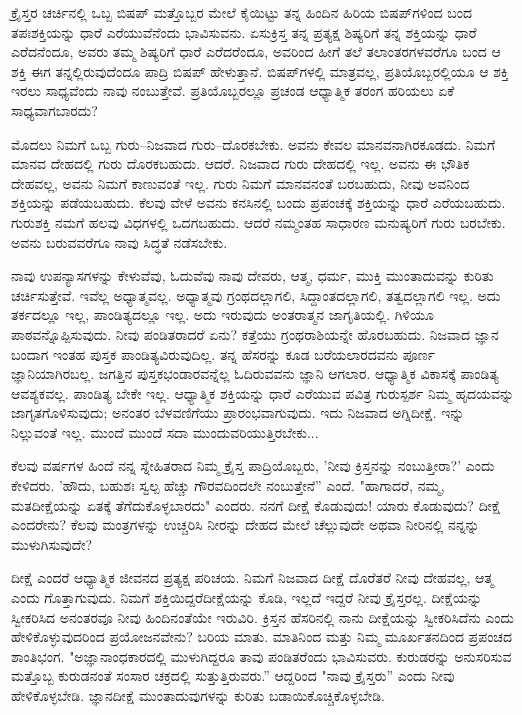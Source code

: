  ಕ್ರೈಸ್ತರ ಚರ್ಚಿನಲ್ಲಿ ಒಬ್ಬ ಬಿಷಪ್ ಮತ್ತೊಬ್ಬರ ಮೇಲೆ ಕೈಯಿಟ್ಟು ತನ್ನ ಹಿಂದಿನ ಹಿರಿಯ ಬಿಷಪ್‌ಗಳಿಂದ ಬಂದ ತಪಃಶಕ್ತಿಯನ್ನು ಧಾರೆ ಎರೆಯುವೆನೆಂದು ಭಾವಿಸುವನು. ಏಸುಕ್ರಿಸ್ತ ತನ್ನ ಪ್ರತ್ಯಕ್ಷ ಶಿಷ್ಯರಿಗೆ ತನ್ನ ಶಕ್ತಿಯನ್ನು ಧಾರೆ ಎರೆದನೆಂದೂ, ಅವರು ತಮ್ಮ ಶಿಷ್ಯರಿಗೆ ಧಾರೆ ಎರೆದರೆಂದೂ, ಅವರಿಂದ ಹೀಗೆ ತಲೆ ತಲಾಂತರಗಳವರೆಗೂ ಬಂದ ಆ ಶಕ್ತಿ ಈಗ ತನ್ನಲ್ಲಿರುವುದೆಂದೂ ಪಾದ್ರಿ ಬಿಷಪ್ ಹೇಳುತ್ತಾನೆ. ಬಿಷಪ್‌ಗಳಲ್ಲಿ ಮಾತ್ರವಲ್ಲ, ಪ್ರತಿಯೊಬ್ಬರಲ್ಲಿಯೂ ಆ ಶಕ್ತಿ ಇರಲು ಸಾಧ್ಯವೆಂದು ನಾವು ನಂಬುತ್ತೇವೆ. ಪ್ರತಿಯೊಬ್ಬರಲ್ಲೂ ಪ್ರಚಂಡ ಆಧ್ಯಾತ್ಮಿಕ ತರಂಗ ಹರಿಯಲು ಏಕೆ ಸಾಧ್ಯವಾಗಬಾರದು?

ಮೊದಲು ನಿಮಗೆ ಒಬ್ಬ ಗುರು–ನಿಜವಾದ ಗುರು–ದೊರಕಬೇಕು. ಅವನು ಕೇವಲ ಮಾನವನಾಗಿರಕೂಡದು. ನಿಮಗೆ ಮಾನವ ದೇಹದಲ್ಲಿ ಗುರು ದೊರಕಬಹುದು. ಆದರೆ. ನಿಜವಾದ ಗುರು ದೇಹದಲ್ಲಿ ಇಲ್ಲ. ಅವನು ಈ ಭೌತಿಕ ದೇಹವಲ್ಲ, ಅವನು ನಿಮಗೆ ಕಾಣುವಂತೆ ಇಲ್ಲ. ಗುರು ನಿಮಗೆ ಮಾನವನಂತೆ ಬರಬಹುದು, ನೀವು ಅವನಿಂದ ಶಕ್ತಿಯನ್ನು ಪಡೆಯಬಹುದು. ಕೆಲವು ವೇಳೆ ಅವನು ಕನಸಿನಲ್ಲಿ ಬಂದು ಪ್ರಪಂಚಕ್ಕೆ ಶಕ್ತಿಯನ್ನು ಧಾರೆ ಎರೆಯಬಹುದು. ಗುರುಶಕ್ತಿ ನಮಗೆ ಹಲವು ವಿಧಗಳಲ್ಲಿ ಒದಗಬಹುದು. ಆದರೆ ನಮ್ಮಂತಹ ಸಾಧಾರಣ ಮನುಷ್ಯರಿಗೆ ಗುರು ಬರಬೇಕು. ಅವನು ಬರುವವರೆಗೂ ನಾವು ಸಿದ್ಧತೆ ನಡೆಸಬೇಕು.

ನಾವು ಉಪನ್ಯಾಸಗಳನ್ನು ಕೇಳುವೆವು, ಓದುವೆವು ನಾವು ದೇವರು, ಆತ್ಮ, ಧರ್ಮ, ಮುಕ್ತಿ ಮುಂತಾದುವನ್ನು ಕುರಿತು ಚರ್ಚಿಸುತ್ತೇವೆ. ಇವೆಲ್ಲ ಅಧ್ಯಾತ್ಮವಲ್ಲ. ಅಧ್ಯಾತ್ಮವು ಗ್ರಂಥದಲ್ಲಾಗಲಿ, ಸಿದ್ದಾಂತದಲ್ಲಾಗಲಿ, ತತ್ವದಲ್ಲಾಗಲಿ ಇಲ್ಲ. ಅದು ತರ್ಕದಲ್ಲೂ ಇಲ್ಲ, ಪಾಂಡಿತ್ಯದಲ್ಲೂ ಇಲ್ಲ. ಅದು ಇರುವುದು ಅಂತರಾತ್ಮನ ಜಾಗೃತಿಯಲ್ಲಿ. ಗಿಳಿಯೂ ಪಾಠವನ್ನೊಪ್ಪಿಸುವುದು. ನೀವು ಪಂಡಿತರಾದರೆ ಏನು? ಕತ್ತೆಯು ಗ್ರಂಥರಾಶಿಯನ್ನೇ ಹೊರಬಹುದು. ನಿಜವಾದ ಜ್ಞಾನ ಬಂದಾಗ ಇಂತಹ ಪುಸ್ತಕ ಪಾಂಡಿತ್ಯವಿರುವುದಿಲ್ಲ. ತನ್ನ ಹೆಸರನ್ನು ಕೂಡ ಬರೆಯಲಾರದವನು ಪೂರ್ಣ ಜ್ಞಾನಿಯಾಗಿರಬಲ್ಲ. ಜಗತ್ತಿನ ಪುಸ್ತಕಭಂಡಾರವನ್ನೆಲ್ಲ ಓದಿರುವವನು ಜ್ಞಾನಿ ಆಗಲಾರ. ಆಧ್ಯಾತ್ಮಿಕ ವಿಕಾಸಕ್ಕೆ ಪಾಂಡಿತ್ಯ ಆವಶ್ಯಕವಲ್ಲ. ಪಾಂಡಿತ್ಯ ಬೇಕೇ ಇಲ್ಲ. ಆಧ್ಯಾತ್ಮಿಕ ಶಕ್ತಿಯನ್ನು ಧಾರೆ ಎರೆಯುವ ಪವಿತ್ರ ಗುರುಸ್ಪರ್ಶ ನಿಮ್ಮ ಹೃದಯವನ್ನು ಜಾಗೃತಗೊಳಿಸುವುದು; ಅನಂತರ ಬೆಳವಣಿಗೆಯು ಪ್ರಾರಂಭವಾಗುವುದು. ಇದು ನಿಜವಾದ ಅಗ್ನಿದೀಕ್ಷೆ. ಇನ್ನು ನಿಲ್ಲುವಂತೆ ಇಲ್ಲ. ಮುಂದೆ ಮುಂದೆ ಸದಾ ಮುಂದುವರಿಯುತ್ತಿರಬೇಕು...

ಕೆಲವು ವರ್ಷಗಳ ಹಿಂದೆ ನನ್ನ ಸ್ನೇಹಿತರಾದ ನಿಮ್ಮ ಕ್ರೈಸ್ತ ಪಾದ್ರಿಯೊಬ್ಬರು, 'ನೀವು ಕ್ರಿಸ್ತನನ್ನು ನಂಬುತ್ತೀರಾ?' ಎಂದು ಕೇಳಿದರು. 'ಹೌದು, ಬಹುಶಃ ಸ್ವಲ್ಪ ಹೆಚ್ಚು ಗೌರವದಿಂದಲೇ ನಂಬುತ್ತೇನೆ” ಎಂದೆ. "ಹಾಗಾದರೆ, ನಮ್ಮ, ಮತದೀಕ್ಷೆಯನ್ನು ಏತಕ್ಕೆ ತೆಗೆದುಕೊಳ್ಳಬಾರದು" ಎಂದರು. ನನಗೆ ದೀಕ್ಷೆ ಕೊಡುವುದು! ಯಾರು ಕೊಡುವುದು? ದೀಕ್ಷೆ ಎಂದರೇನು? ಕೆಲವು ಮಂತ್ರಗಳನ್ನು ಉಚ್ಚರಿಸಿ ನೀರನ್ನು ದೇಹದ ಮೇಲೆ ಚೆಲ್ಲುವುದೇ ಅಥವಾ ನೀರಿನಲ್ಲಿ ನನ್ನನ್ನು ಮುಳುಗಿಸುವುದೇ?

ದೀಕ್ಷೆ ಎಂದರೆ ಆಧ್ಯಾತ್ಮಿಕ ಜೀವನದ ಪ್ರತ್ಯಕ್ಷ ಪರಿಚಯ. ನಿಮಗೆ ನಿಜವಾದ ದೀಕ್ಷೆ ದೊರೆತರೆ ನೀವು ದೇಹವಲ್ಲ, ಆತ್ಮ ಎಂದು ಗೊತ್ತಾಗುವುದು. ನಿಮಗೆ ಶಕ್ತಿಯಿದ್ದರೆ\break ದೀಕ್ಷೆಯನ್ನು ಕೊಡಿ, ಇಲ್ಲದೆ ಇದ್ದರೆ ನೀವು ಕ್ರೈಸ್ತರಲ್ಲ. ದೀಕ್ಷೆಯನ್ನು ಸ್ವೀಕರಿಸಿದ ಅನಂತರವೂ ನೀವು ಹಿಂದಿನಂತೆಯೇ ಇರುವಿರಿ. ಕ್ರಿಸ್ತನ ಹೆಸರಿನಲ್ಲಿ ನಾನು ದೀಕ್ಷೆಯನ್ನು ಸ್ವೀಕರಿಸಿದೆನು ಎಂದು ಹೇಳಿಕೊಳ್ಳುವುದರಿಂದ ಪ್ರಯೋಜನವೇನು? ಬರಿಯ ಮಾತು. ಮಾತಿನಿಂದ ಮತ್ತು ನಿಮ್ಮ ಮೂರ್ಖತನದಿಂದ ಪ್ರಪಂಚದ ಶಾಂತಿಭಂಗ. "ಅಜ್ಞಾನಾಂಧಕಾರದಲ್ಲಿ ಮುಳುಗಿದ್ದರೂ ತಾವು ಪಂಡಿತರೆಂದು ಭಾವಿಸುವರು. ಕುರುಡರನ್ನು ಅನುಸರಿಸುವ ಮತ್ತೊಬ್ಬ ಕುರುಡನಂತೆ ಸಂಸಾರ ಚಕ್ರದಲ್ಲಿ ಸುತ್ತುತ್ತಿರುವರು.” ಆದ್ದರಿಂದ "ನಾವು ಕ್ರೈಸ್ತರು'' ಎಂದು ನೀವು ಹೇಳಿಕೊಳ್ಳಬೇಡಿ. ಜ್ಞಾನದೀಕ್ಷೆ ಮುಂತಾದುವುಗಳನ್ನು ಕುರಿತು ಬಡಾಯಿಕೊಚ್ಚಿಕೊಳ್ಳಬೇಡಿ.

